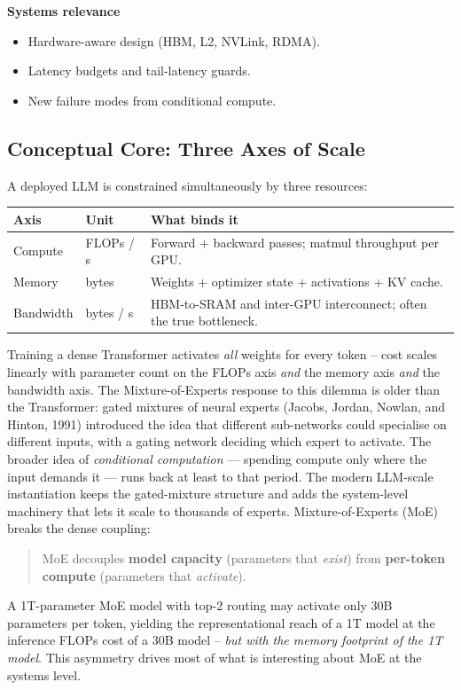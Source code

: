 \textbf{Systems relevance}
\begin{itemize}
  \item Hardware-aware design (HBM, L2, NVLink, RDMA).
  \item Latency budgets and tail-latency guards.
  \item New failure modes from conditional compute.
\end{itemize}

\subsection{Conceptual Core: Three Axes of Scale}

A deployed LLM is constrained simultaneously by three resources:
\begin{center}
\begin{tabular}{|p{2.6cm}|p{3.4cm}|p{8.0cm}|}
\hline
Axis & Unit & What binds it \\
\hline
Compute   & FLOPs / s   & Forward + backward passes; matmul
                          throughput per GPU. \\
Memory    & bytes       & Weights + optimizer state + activations +
                          KV cache. \\
Bandwidth & bytes / s   & HBM-to-SRAM and inter-GPU interconnect;
                          often the true bottleneck. \\
\hline
\end{tabular}
\end{center}

Training a dense Transformer activates \emph{all} weights for every
token -- cost scales linearly with parameter count on the FLOPs axis
\emph{and} the memory axis \emph{and} the bandwidth axis.
The Mixture-of-Experts response to this dilemma is older than the
Transformer: gated mixtures of neural experts (Jacobs, Jordan,
Nowlan, and Hinton, 1991) introduced the idea that different
sub-networks could specialise on different inputs, with a gating
network deciding which expert to activate. The broader idea of
\emph{conditional computation} --- spending compute only where the
input demands it --- runs back at least to that period. The modern
LLM-scale instantiation \citep{shazeer2017outrageously,
fedus2021switch} keeps the gated-mixture structure and adds the
system-level machinery that lets it scale to thousands of experts. Mixture-of-Experts (MoE) breaks the dense
coupling:
\begin{quote}
MoE decouples \textbf{model capacity} (parameters that \emph{exist})
from \textbf{per-token compute} (parameters that \emph{activate}).
\end{quote}
A 1T-parameter MoE model with top-2 routing may activate only 30B
parameters per token, yielding the representational reach of a 1T
model at the inference FLOPs cost of a 30B model -- \emph{but with the
memory footprint of the 1T model}. This asymmetry drives most of what
is interesting about MoE at the systems level.

